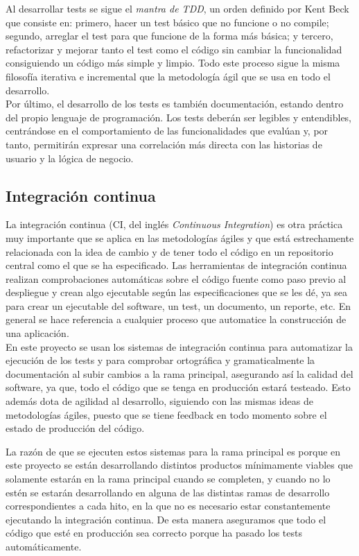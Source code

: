 Al desarrollar tests se sigue el \textit{mantra de TDD}, un orden definido por Kent Beck \cite{beck2002driven} que consiste en: primero, hacer un test básico que no funcione o no compile; segundo, arreglar el test para que funcione de la forma más básica; y tercero, refactorizar y mejorar tanto el test como el código sin cambiar la funcionalidad consiguiendo un código más simple y limpio. Todo este proceso sigue la misma filosofía iterativa e incremental que la metodología ágil que se usa en todo el desarrollo.\\

Por último, el desarrollo de los tests es también documentación, estando dentro del propio lenguaje de programación. Los tests deberán ser legibles y entendibles, centrándose en el comportamiento de las funcionalidades que evalúan y, por tanto, permitirán expresar una correlación más directa con las historias de usuario y la lógica de negocio.

\subsection{Integración continua}
La integración continua (CI, del inglés \textit{Continuous Integration}) es otra práctica muy importante que se aplica en las metodologías ágiles y que está estrechamente relacionada con la idea de cambio y de tener todo el código en un repositorio central como el que se ha especificado. Las herramientas de integración continua realizan comprobaciones automáticas sobre el código fuente como paso previo al despliegue y crean algo ejecutable según las especificaciones que se les dé, ya sea para crear un ejecutable del software, un test, un documento, un reporte, etc. En general se hace referencia a cualquier proceso que automatice la construcción de una aplicación.\\

En este proyecto se usan los sistemas de integración continua para automatizar la ejecución de los tests y para comprobar ortográfica y gramaticalmente la documentación al subir cambios a la rama principal, asegurando así la calidad del software, ya que, todo el código que se tenga en producción estará testeado. Esto además dota de agilidad al desarrollo, siguiendo con las mismas ideas de metodologías ágiles, puesto que se tiene feedback en todo momento sobre el estado de producción del código.

La razón de que se ejecuten estos sistemas para la rama principal es porque en este proyecto se están desarrollando distintos productos mínimamente viables que solamente estarán en la rama principal cuando se completen, y cuando no lo estén se estarán desarrollando en alguna de las distintas ramas de desarrollo correspondientes a cada hito, en la que no es necesario estar constantemente ejecutando la integración continua. De esta manera aseguramos que todo el código que esté en producción sea correcto porque ha pasado los tests automáticamente.\\

